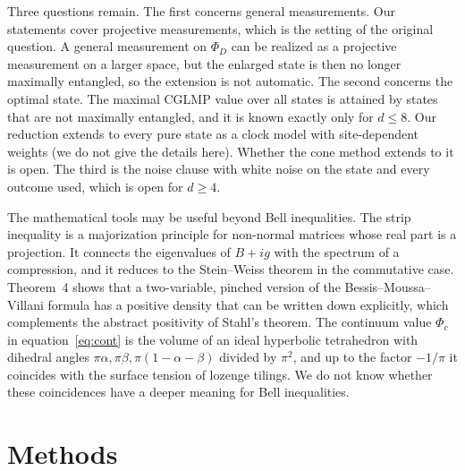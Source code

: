 \documentclass[11pt]{article}
\begin{document}
Three questions remain. The first concerns general measurements. Our statements cover projective measurements, which
is the setting of the original question. A general measurement on $\Phi_D$ can be realized as a projective measurement
on a larger space, but the enlarged state is then no longer maximally entangled, so the extension is not automatic. The
second concerns the optimal state. The maximal CGLMP value over all states is attained by states that are not maximally
entangled\cite{ADGL2002}, and it is known exactly only for $d\le8$. Our reduction extends to every pure state as a
clock model with site-dependent weights (we do not give the details here). Whether the cone method extends to it is
open. The third is the noise clause with white noise on the state and every outcome used, which is open for $d\ge4$.

The mathematical tools may be useful beyond Bell inequalities. The strip inequality is a majorization principle for
non-normal matrices whose real part is a projection. It connects the eigenvalues of $B+ig$ with the spectrum of a
compression, and it reduces to the Stein--Weiss theorem in the commutative case. Theorem~4 shows that a two-variable,
pinched version of the Bessis--Moussa--Villani formula has a positive density that can be written down explicitly,
which complements the abstract positivity of Stahl's theorem\cite{Stahl2013,Heinavaara2023}. The continuum value
$\Phi_c$ in equation~\eqref{eq:cont} is the volume of an ideal hyperbolic tetrahedron with dihedral angles
$\pi\alpha,\pi\beta,\pi(1-\alpha-\beta)$ divided by $\pi^2$\cite{Milnor1982}, and up to the factor $-1/\pi$ it coincides
with the surface tension of lozenge tilings\cite{KOS2006}. We do not know whether these coincidences have a deeper meaning for Bell
inequalities.

\section*{Methods}
\end{document}
